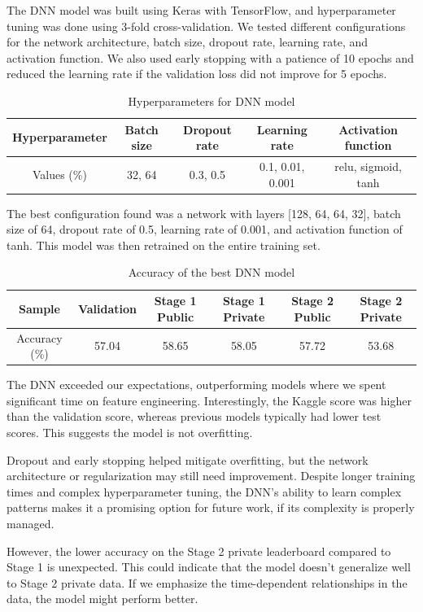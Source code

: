 \documentclass[10pt,a4paper]{article}
\begin{document}
The DNN model was built using Keras with TensorFlow, and hyperparameter tuning was done using 3-fold cross-validation. We tested different configurations for the network architecture, batch size, dropout rate, learning rate, and activation function. We also used early stopping with a patience of 10 epochs and reduced the learning rate if the validation loss did not improve for 5 epochs.


\begin{table}[H]
  \centering
  \begin{tabular}{|c|c|c|c|c|}
  \hline
  Hyperparameter & Batch size & Dropout rate & Learning rate & Activation function \\ \hline
  Values (\%) & 32, 64 & 0.3, 0.5 & 0.1, 0.01, 0.001 & relu, sigmoid, tanh \\ \hline
  \end{tabular}
  \caption{Hyperparameters for DNN model}
\end{table}

The best configuration found was a network with layers [128, 64, 64, 32], batch size of 64, dropout rate of 0.5, learning rate of 0.001, and activation function of tanh. This model was then retrained on the entire training set.

\begin{table}[H]
  \centering
  \begin{tabular}{|c|c|c|c|c|c|}
  \hline
  Sample & Validation & Stage 1 Public & Stage 1 Private & Stage 2 Public & Stage 2 Private \\ \hline
  Accuracy (\%) & 57.04 & 58.65 & 58.05 & 57.72 & 53.68 \\ \hline
  \end{tabular}
  \caption{Accuracy of the best DNN model}
\end{table}

The DNN exceeded our expectations, outperforming models where we spent significant time on feature engineering. Interestingly, the Kaggle score was higher than the validation score, whereas previous models typically had lower test scores. This suggests the model is not overfitting.

Dropout and early stopping helped mitigate overfitting, but the network architecture or regularization may still need improvement. Despite longer training times and complex hyperparameter tuning, the DNN's ability to learn complex patterns makes it a promising option for future work, if its complexity is properly managed.

However, the lower accuracy on the Stage 2 private leaderboard compared to Stage 1 is unexpected. This could indicate that the model doesn't generalize well to Stage 2 private data. If we emphasize the time-dependent relationships in the data, the model might perform better.
\end{document}
